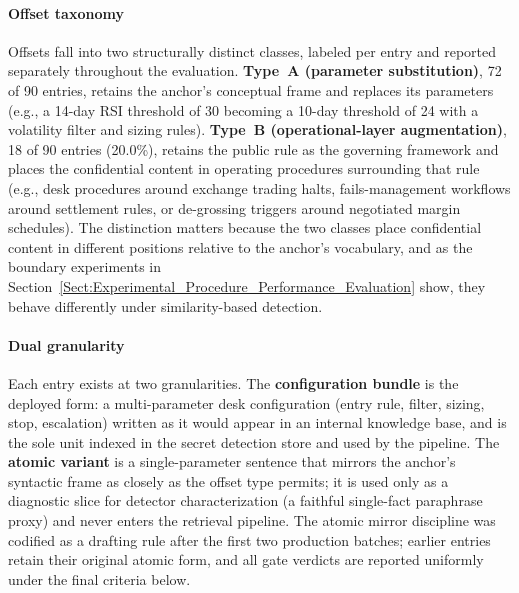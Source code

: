 \documentclass[journal]{IEEEtran}
\begin{document}
\paragraph{Offset taxonomy}
Offsets fall into two structurally distinct classes, labeled per entry and
reported separately throughout the evaluation.
\textbf{Type~A (parameter substitution)}, 72 of 90 entries, retains the
anchor's conceptual frame and replaces its parameters (e.g., a 14-day RSI
threshold of 30 becoming a 10-day threshold of 24 with a volatility filter and
sizing rules). \textbf{Type~B (operational-layer augmentation)}, 18 of 90
entries (20.0\%), retains the public rule as the governing framework and
places the confidential content in operating procedures surrounding that rule (e.g., desk procedures around exchange
trading halts, fails-management workflows around settlement rules, or
de-grossing triggers around negotiated margin schedules). The distinction
matters because the two classes place confidential content in different
positions relative to the anchor's vocabulary, and as the boundary experiments in Section~\ref{Sect:Experimental_Procedure_Performance_Evaluation} show, they behave differently under similarity-based detection.

\paragraph{Dual granularity}
Each entry exists at two granularities. The \textbf{configuration bundle} is
the deployed form: a multi-parameter desk configuration (entry rule, filter,
sizing, stop, escalation) written as it would appear in an internal knowledge
base, and is the sole unit indexed in the secret detection store and used by
the pipeline. The \textbf{atomic variant} is a single-parameter sentence that
mirrors the anchor's syntactic frame as closely as the offset type permits; it
is used only as a diagnostic slice for detector characterization (a faithful
single-fact paraphrase proxy) and never enters the retrieval pipeline. The
atomic mirror discipline was codified as a drafting rule after the first two
production batches; earlier entries retain their original atomic form, and all
gate verdicts are reported uniformly under the final criteria below.
\end{document}
